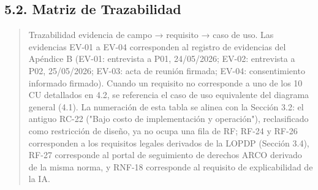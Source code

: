 \documentclass[
]{article}
\begin{document}
\subsection{5.2. Matriz de Trazabilidad}\label{matriz-de-trazabilidad}
\begin{quote}
Trazabilidad evidencia de campo → requisito → caso de uso. Las
evidencias EV-01 a EV-04 corresponden al registro de evidencias del
Apéndice B (EV-01: entrevista a P01, 24/05/2026; EV-02:
entrevista a P02, 25/05/2026; EV-03: acta de reunión firmada; EV-04:
consentimiento informado firmado). Cuando un requisito no corresponde a
uno de los 10 CU detallados en 4.2, se referencia el caso de uso
equivalente del diagrama general (4.1). La numeración de esta tabla se
alinea con la Sección 3.2: el antiguo RC-22 ("Bajo costo de
implementación y operación"), reclasificado como restricción de diseño,
ya no ocupa una fila de RF; RF-24 y RF-26 corresponden a los requisitos
legales derivados de la LOPDP (Sección 3.4), RF-27 corresponde al
portal de seguimiento de derechos ARCO derivado de la misma norma, y
RNF-18 corresponde al requisito de explicabilidad de la IA.


\end{quote}
\end{document}
